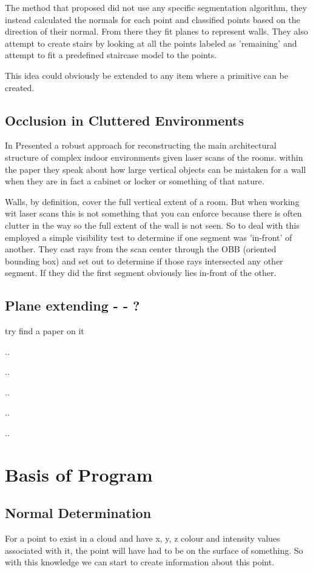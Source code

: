 		The method that \citeauthor{sanchez_planar_2012} proposed did not use any specific segmentation algorithm, they instead calculated the normals for each point and classified points based on the direction of their normal. From there they fit planes to represent walls. They also attempt to create stairs by looking at all the points labeled as 'remaining' and attempt to fit a predefined staircase model to the points.
		
		This idea could obviously be extended to any item where a primitive can be created. 
		
	\subsection{Occlusion in Cluttered Environments}
		In \citeyear{mura_automatic_2014} \citeauthor{mura_automatic_2014} Presented a robust approach for reconstructing the main architectural structure of complex indoor environments given laser scans of the rooms. within the paper they speak about how large vertical objects can be mistaken for a wall when they are in fact a cabinet or locker or something of that nature.
		
		Walls, by definition, cover the full vertical extent of a room. But when working wit laser scans this is not something that you can enforce because there is often clutter in the way so the full extent of the wall is not seen. So to deal with this \citeauthor{mura_automatic_2014} employed a simple visibility test to determine if one segment was 'in-front' of another. They cast rays from the scan center through the OBB (oriented bounding box) and set out to determine if those rays intersected any other segment. If they did the first segment obviously lies in-front of the other.
	
	\subsection{Plane extending - - ?}
		try find a paper on it
		
		..
		
		..
		
		..
		
		..
		
		..
	
	
\section{Basis of Program}
	\subsection{Normal Determination}
		For a point to exist in a cloud and have x, y, z colour and intensity values associated with it, the point will have had to be on the surface of something. So with this knowledge we can start to create information about this point.
		

